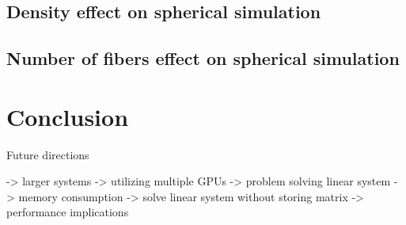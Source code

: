 \documentclass[a4paper,11pt]{kth-mag}
\begin{document}
\section{Density effect on spherical simulation}
\section{Number of fibers effect on spherical simulation}

\chapter{Conclusion}

Future directions

-> larger systems -> utilizing multiple GPUs -> problem solving linear system
-> memory consumption -> solve linear system without storing matrix -> performance implications

\appendix
\addappheadtotoc
\end{document}

